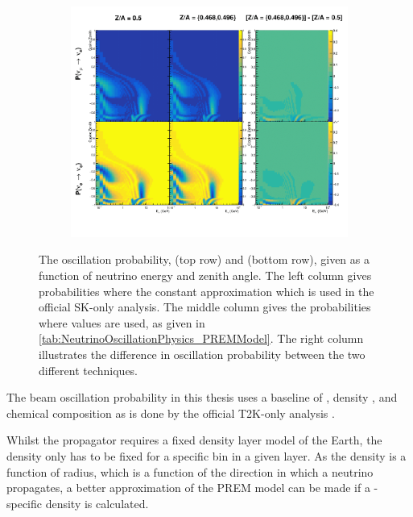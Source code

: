 \begin{figure}[h]
  \begin{subfigure}[t]{\textwidth}
    \includegraphics[width=\textwidth, trim={0mm 0mm 0mm 0mm}, clip,page=1]{Figures/Oscillation/ChemicalComposition.pdf}
  \end{subfigure}
  \caption{The oscillation probability,  (top row) and  (bottom row), given as a function of neutrino energy and zenith angle. The left column gives probabilities where the constant  approximation which is used in the official SK-only analysis. The middle column gives the probabilities where  values are used, as given in \autoref{tab:NeutrinoOscillationPhysics_PREMModel}. The right column illustrates the difference in oscillation probability between the two different techniques.}
  \label{fig:Oscillation_SK_ChemicalComposition}
\end{figure}

The beam oscillation probability in this thesis uses a baseline of , density , and chemical composition  as is done by the official T2K-only analysis \cite{Hagiwara2011}. 

Whilst the propagator requires a fixed density layer model of the Earth, the density only has to be fixed for a specific  bin in a given layer. As the density is a function of radius, which is a function of the direction in which a neutrino propagates, a better approximation of the PREM model can be made if a -specific density is calculated. 

